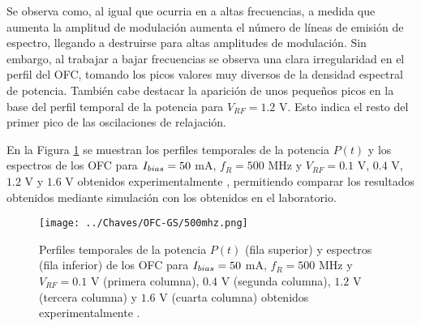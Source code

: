 		Se observa como, al igual que ocurria en a altas frecuencias, a medida que aumenta la amplitud de modulación aumenta el n\'umero de l\'ineas de emisión de espectro, llegando a destruirse para altas amplitudes de modulación. Sin embargo, al trabajar a bajar frecuencias se observa una clara irregularidad en el perfil del OFC, tomando los picos valores muy diversos de la densidad espectral de potencia. Tambi\'en cabe destacar la aparici\'on de unos pequeños picos en la base del perfil temporal de la potencia para $V_{RF} = 1.2$ V. Esto indica el resto del primer pico de las oscilaciones de relajación.		

		En la Figura \ref{Img:500mhz} se muestran los perfiles temporales de la potencia $P(t)$ y los espectros de los OFC para $I_{bias} = 50$ mA, $f_R = 500$ MHz y $V_{RF} = 0.1$ V, $0.4$ V, $1.2$ V y $1.6$ V obtenidos experimentalmente \cite{Chaves19}, permitiendo comparar los resultados obtenidos mediante simulación con los obtenidos en el laboratorio.

			\begin{figure}[H]
				\centering
				\texttt{[image: ../Chaves/OFC-GS/500mhz.png]}
				\vspace{-1.5cm}
				\caption{\label{Img:500mhz}Perfiles temporales de la potencia $P(t)$ (fila superior) y espectros (fila inferior) de los OFC para $I_{bias} = 50$ mA, $f_R = 500$ MHz y $V_{RF} = 0.1$ V (primera columna), $0.4$ V (segunda columna), $1.2$ V (tercera columna) y $1.6$ V (cuarta columna) obtenidos experimentalmente \cite{Chaves19}.}	
			\end{figure}

